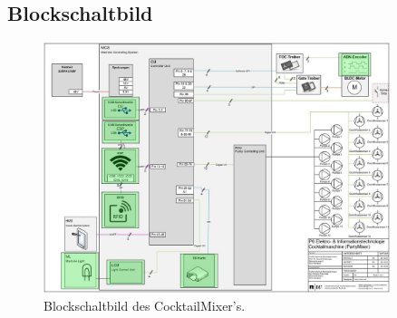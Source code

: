\subsection{Blockschaltbild}
\label{subsec:Blockschaldbild}

\begin{figure}[h!]
\center
\includegraphics[angle=90, width = 0.9\textwidth]{graphics/Blockschaltbild}
\caption{Blockschaltbild des CocktailMixer's.}
\label{fig:Blockschaltbild_Cocktailmixer}
\end{figure}

